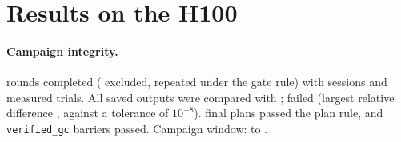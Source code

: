 \documentclass[sigconf, nonacm]{acmart}
\begin{document}
\section{Results on the H100}
\label{sec:results}

\paragraph{Campaign integrity.}  rounds completed
( excluded, 
repeated under the gate rule) with  sessions and
 measured trials. All 
saved outputs were compared with \polarscpu{}; 
failed (largest relative difference , against a
tolerance of $10^{-8}$).  \sparkgpu{} final
plans passed the plan rule, and 
\texttt{verified\_gc} barriers passed. Campaign window:
 to .
\end{document}
